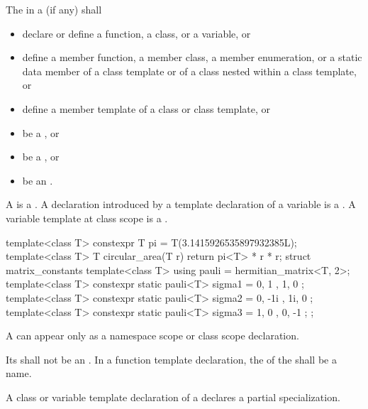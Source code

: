 \pnum
The  in a  (if any)
shall
\begin{itemize}
\item declare or define a function, a class, or a variable, or

\item define a member function, a member class, a member enumeration, or a static data member of a
class template or of a class nested within a class template, or

\item define a member template of a class or class template, or

\item be a , or

\item be a , or

\item be an .
\end{itemize}

\pnum
A  is a .
A declaration introduced by a template declaration of a
%
variable is a . A variable template at class scope is a
.

\begin{example}
\begin{codeblock}
template<class T>
  constexpr T pi = T(3.1415926535897932385L);
template<class T>
  T circular_area(T r) {
    return pi<T> * r * r;
  }
struct matrix_constants {
  template<class T>
    using pauli = hermitian_matrix<T, 2>;
  template<class T>
    constexpr static pauli<T> sigma1 = { { 0, 1 }, { 1, 0 } };
  template<class T>
    constexpr static pauli<T> sigma2 = { { 0, -1i }, { 1i, 0 } };
  template<class T>
    constexpr static pauli<T> sigma3 = { { 1, 0 }, { 0, -1 } };
};
\end{codeblock}
\end{example}

\pnum
\begin{note}
A 
can appear only as a namespace scope or class scope declaration.
\end{note}
Its  shall not be an
.
In a function template declaration, the  of the
 shall be a name.
\begin{note}
A class or variable template declaration of a 
declares a partial specialization.
\end{note}

